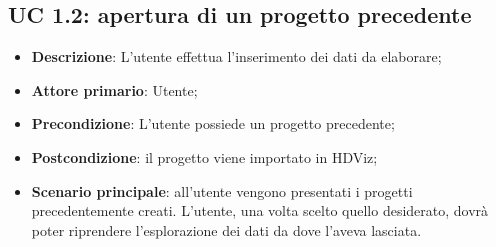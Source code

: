 \subsection{UC 1.2: apertura di un progetto precedente}
\begin{itemize}
    \item{\textbf{Descrizione}}: L'utente effettua l'inserimento dei dati da elaborare;
    \item{\textbf{Attore primario}}: Utente;
    \item{\textbf{Precondizione}}: L'utente possiede un progetto precedente;
    \item{\textbf{Postcondizione}}: il progetto viene importato in HDViz;
    \item{\textbf{Scenario principale}}: all'utente vengono presentati i progetti precedentemente creati. L'utente, una volta scelto quello desiderato, dovrà poter riprendere l'esplorazione dei dati da dove l'aveva lasciata.
\end{itemize}
